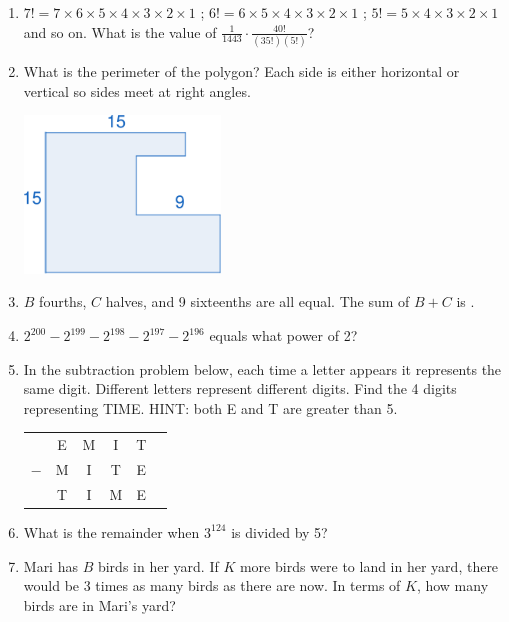 \begin{enumerate}
	\item $7!=7\times6\times5\times4\times3\times2\times1$ ; $6!=6\times5\times4\times3\times2\times1$ ; $5!=5\times4\times3\times2\times1$ and so on. What is the value of ${\displaystyle \frac{1}{1443}\cdot\frac{40!}{\left(35!\right)\left(5!\right)}}$?
	
	\item What is the perimeter of the polygon? Each side is either horizontal or vertical so sides meet at right angles.
	\begin{center}
		\includegraphics[height=4.2cm]{images/FinalProject-fig02.pdf}\par
	\end{center}
	
	\item $B$ fourths, $C$ halves, and 9 sixteenths are all equal. The sum of $B+C$ is \raisebox{-3pt}{\rule{0.5in}{1pt}}.
	
	\item $2^{200}-2^{199}-2^{198}-2^{197}-2^{196}$ equals what power of 2?
	
	\item In the subtraction problem below, each time a letter appears it represents the same digit. Different letters represent different digits. Find the 4 digits representing TIME. HINT: both E and T are greater than 5.
	\begin{center}
		\begin{tabular}{cccccc}
				& E & M & I & T & \tabularnewline
			$-$ & M & I & T & E & \tabularnewline
			\hline 
				& T & I & M & E & \tabularnewline
		\end{tabular}\par
	\end{center}
	
	\item What is the remainder when $3^{124}$ is divided by 5?
	
	\item Mari has $B$ birds in her yard. If $K$ more birds were to land in her yard, there would be 3 times as many birds as there are now. In terms of $K$, how many birds are in Mari's yard?
	

\end{enumerate}
